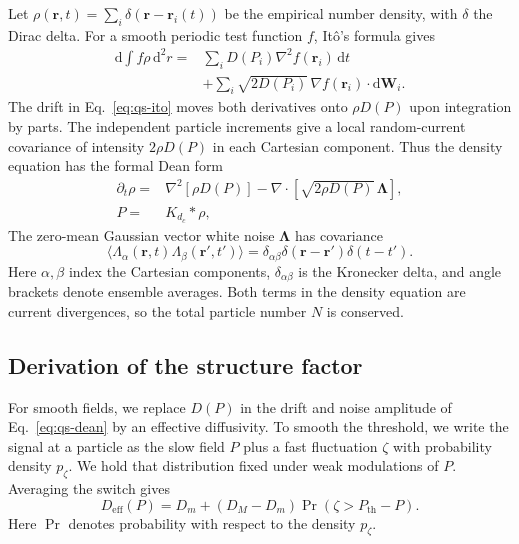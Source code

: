 \documentclass[aps,prl,reprint,letterpaper]{revtex4-2}
\begin{document}
Let \(\rho(\mathbf r,t)=\sum_i\delta(\mathbf r-\mathbf r_i(t))\) be the empirical number density, with \(\delta\) the Dirac delta. For a smooth periodic test function \(f\), It\^{o}'s formula gives
\begin{equation}
    \begin{aligned}
        \mathrm{d}\!\int f\rho\,\mathrm{d}^2r
        ={}&\sum_i D(P_i)\nabla^2 f(\mathbf r_i)\,\mathrm{d}t\\
        &+\sum_i\sqrt{2D(P_i)}\,\nabla f(\mathbf r_i)\cdot \mathrm{d}\mathbf W_i .
    \end{aligned}
    \label{eq:qs-ito}
\end{equation}
The drift in Eq.~\eqref{eq:qs-ito} moves both derivatives onto \(\rho D(P)\) upon integration by parts. The independent particle increments give a local random-current covariance of intensity \(2\rho D(P)\) in each Cartesian component. Thus the density equation has the formal Dean form~\cite{Dean1996}
\begin{equation}
    \begin{aligned}
        \partial_t\rho={}&\nabla^2[\rho D(P)]
        -\nabla\cdot\!\left[\sqrt{2\rho D(P)}\,\boldsymbol\Lambda\right],\\
        P={}&K_{d_c}*\rho ,
    \end{aligned}
    \label{eq:qs-dean}
\end{equation}
The zero-mean Gaussian vector white noise \(\boldsymbol\Lambda\) has covariance
\[
    \langle\Lambda_\alpha(\mathbf r,t)\Lambda_\beta(\mathbf r',t')\rangle
    =\delta_{\alpha\beta}\delta(\mathbf r-\mathbf r')\delta(t-t').
\]
Here \(\alpha,\beta\) index the Cartesian components, \(\delta_{\alpha\beta}\) is the Kronecker delta, and angle brackets denote ensemble averages. Both terms in the density equation are current divergences, so the total particle number \(N\) is conserved.

\subsection*{Derivation of the structure factor}

For smooth fields, we replace \(D(P)\) in the drift and noise amplitude of Eq.~\eqref{eq:qs-dean} by an effective diffusivity. To smooth the threshold, we write the signal at a particle as the slow field \(P\) plus a fast fluctuation \(\zeta\) with probability density \(p_\zeta\). We hold that distribution fixed under weak modulations of \(P\). Averaging the switch gives
\begin{equation}
    D_{\mathrm{eff}}(P)
    = D_m+(D_M-D_m)\Pr(\zeta>P_{\mathrm{th}}-P).
    \label{eq:qs-slope}
\end{equation}
Here \(\Pr\) denotes probability with respect to the density \(p_\zeta\).
\end{document}
